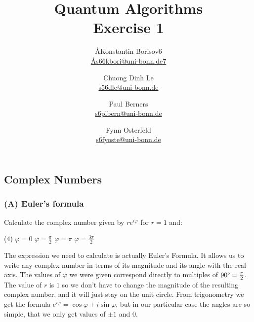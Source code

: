 \documentclass{article}
\title{Quantum Algorithms \\ Exercise 1}
\author{
  \AA{Konstantin Borisov}{6} \\ \href{mailto:\AA{s66kbori@uni-bonn.de}{7}}{\AA{s66kbori@uni-bonn.de}{7}} \and
  Chuong Dinh Le \\ \href{mailto:s56dle@uni-bonn.de}{s56dle@uni-bonn.de} \and
  Paul Berners \\ \href{mailto:s6plbern@uni-bonn.de}{s6plbern@uni-bonn.de} \and
  Fynn Osterfeld \\ \href{mailto:s6fyoste@uni-bonn.de}{s6fyoste@uni-bonn.de}
}
\let\phi\varphi
\begin{document}
  \maketitle

  \setcounter{section}{1}
  \subsection{Complex Numbers}
  \subsubsection*{(A) Euler's formula}
  \begin{centerframebox}
    Calculate the complex number given by $re^{i\phi}$ for $r = 1$ and:
    \begin{tasks}[style=itemize](4)
      \task $\phi = 0$
      \task $\phi = \frac{\pi}{2}$
      \task $\phi = \pi$
      \task $\phi = \frac{3\pi}{2}$
    \end{tasks}
  \end{centerframebox}
  \begin{figure}
    \vspace{-.5cm}
    \centering
  \end{figure}

  The expression we need to calculate is actually Euler's Formula.
  It allows us to write any complex number in terms of its magnitude and its angle with the real axis.
  The values of $\phi$ we were given correspond directly to multiples of $90\degree = \frac{\pi}{2}$.
  The value of $r$ is $1$ so we don't have to change the magnitude of the resulting complex number,
  and it will just stay on the unit circle.
  From trigonometry we get the formula $e^{i\phi} = \cos \phi + i\sin \phi$,
  but in our particular case the angles are so simple, that we only get values of $\pm 1$ and $0$.
\end{document}
